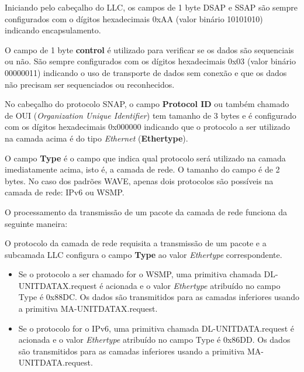 \documentclass[
12pt,				%
openright,			%
oneside,			%
a4paper,			%
brazil,				%
]{abntex2}
\begin{document}
	\par Iniciando pelo cabeçalho do LLC, os campos de 1 byte DSAP e SSAP são sempre configurados com o dígitos hexadecimais 0xAA (valor binário 10101010) indicando encapsulamento.
	
	\par O campo de 1 byte \textbf{control} é utilizado para verificar se os dados são sequenciais ou não. São sempre configurados com os dígitos hexadecimais 0x03 (valor binário 00000011) indicando o uso de transporte de dados sem conexão e que os dados não precisam ser sequenciados ou reconhecidos.
	
	\par No cabeçalho do protocolo SNAP, o campo \textbf{Protocol ID} ou também chamado de OUI (\textit{Organization Unique Identifier}) tem tamanho de 3 bytes e é configurado com os dígitos hexadecimais 0x000000 indicando que o protocolo a ser utilizado na camada acima é do tipo \textit{Ethernet} (\textbf{Ethertype}).
	
	\par O campo \textbf{Type} é o campo que indica qual protocolo será utilizado na camada imediatamente acima, isto é, a camada de rede. O tamanho do campo é de 2 bytes. No caso dos padrões WAVE, apenas dois protocolos são possíveis na camada de rede: IPv6 ou WSMP. 
	
	\par O processamento da transmissão de um pacote da camada de rede funciona da seguinte maneira: 
	
	\par O protocolo da camada de rede requisita a transmissão de um pacote e a subcamada LLC configura o campo \textbf{Type} ao valor \textit{Ethertype} correspondente. 
	
	\begin{itemize} %
	    \item Se o protocolo a ser chamado for o WSMP, uma primitiva chamada DL-UNITDATAX.request é acionada e o valor \textit{Ethertype} atribuído no campo Type é 0x88DC. Os dados são transmitidos para as camadas inferiores usando a primitiva MA-UNITDATAX.request. 
        \item Se o protocolo for o IPv6, uma primitiva chamada DL-UNITDATA.request é acionada e o valor \textit{Ethertype} atribuído no campo Type é 0x86DD. Os dados são transmitidos para as camadas inferiores usando a primitiva MA-UNITDATA.request.
    \end{itemize}
	
\end{document}

